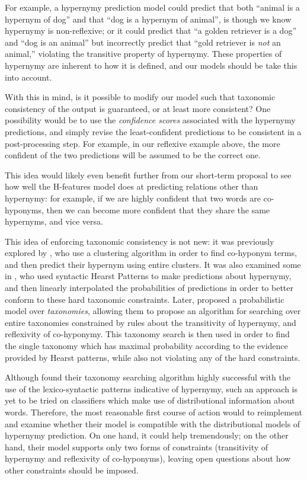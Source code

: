 \documentclass[12pt]{article}
\begin{document}
For example, a hypernymy prediction model could predict that both ``animal is a
hypernym of dog'' and that ``dog is a hypernym of animal'', is though we know
hypernymy is non-reflexive; or it could predict that ``a golden retriever is a
dog'' and ``dog is an animal'' but incorrectly predict that ``gold retriever is
{\em not} an animal,'' violating the transitive property of hypernymy. These
properties of hypernymy are inherent to how it is defined, and our models
should be take this into account.

With this in mind, is it possible to modify our model such that taxonomic
consistency of the output is guaranteed, or at least more consistent? One
possibility would be to use the {\em confidence scores} associated with the
hypernymy predictions, and simply revise the least-confident predictions to
be consistent in a post-processing step. For example, in our reflexive example
above, the more confident of the two predictions will be assumed to be
the correct one.

This idea would likely even benefit further from our short-term proposal to
see how well the H-features model does at predicting relations other
than hypernymy: for example, if we are highly confident that two words are
co-hyponyms, then we can become more confident that they share the same
hypernyms, and vice versa.

This idea of enforcing taxonomic consistency is not new: it was previously
explored by , who use a clustering algorithm in
order to find co-hyponym terms, and then predict their hypernym using entire
clusters. It was also examined some in , who used
syntactic Hearst Patterns to make predictions about hypernymy, and then
linearly interpolated the probabilities of predictions in order to better
conform to these hard taxonomic constraints. Later, 
proposed a probabilistic model over {\em taxonomies}, allowing them to propose
an algorithm for searching over entire taxonomies constrained by rules about
the transitivity of hypernymy, and reflexivity of co-hyponymy. This taxonomy
search is then used in order to find the single taxonomy which has maximal
probability according to the evidence provided by Hearst patterns, while also
not violating any of the hard constraints.

Although  found their taxonomy searching algorithm
highly successful with the use of the lexico-syntactic patterns indicative
of hypernymy, such an approach is yet to be tried on classifiers which make
use of distributional information about words. Therefore, the most reasonable
first course of action would to reimplement and examine whether their model
is compatible with the distributional models of hypernymy prediction. On one
hand, it could help tremendously; on the other hand, their model supports only
two forms of constraints (transitivity of hypernymy and reflexivity of
co-hyponyms), leaving open questions about how other constraints should be
imposed.
\end{document}
